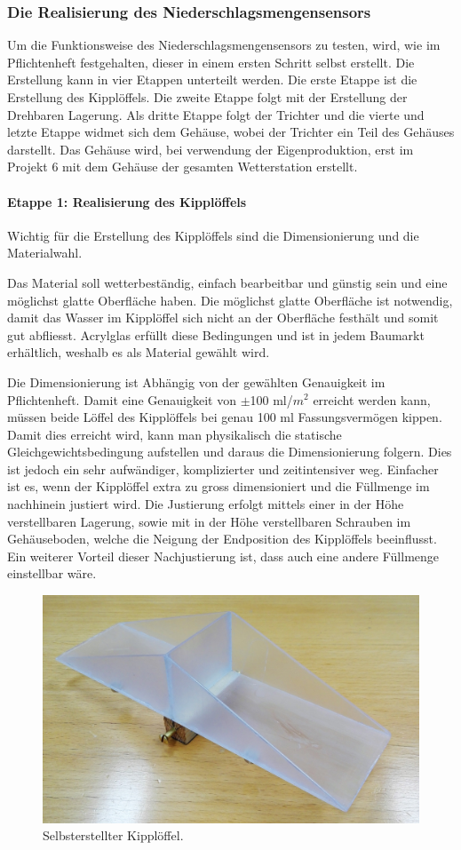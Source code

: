 \subsubsection*{Die Realisierung des Niederschlagsmengensensors}
Um die Funktionsweise des Niederschlagsmengensensors  zu testen, wird, wie im Pflichtenheft festgehalten, dieser in einem ersten Schritt selbst erstellt. Die Erstellung kann in vier Etappen unterteilt werden. Die erste Etappe ist die Erstellung des Kipplöffels. Die zweite Etappe folgt mit der Erstellung der Drehbaren Lagerung. Als dritte Etappe folgt der Trichter und die vierte und letzte Etappe widmet sich dem Gehäuse, wobei der Trichter ein Teil des Gehäuses darstellt. Das Gehäuse wird, bei verwendung der Eigenproduktion, erst im Projekt 6 mit dem Gehäuse der gesamten Wetterstation erstellt.
\paragraph{Etappe 1: Realisierung des Kipplöffels}
Wichtig für die Erstellung des Kipplöffels sind die Dimensionierung und die Materialwahl.
 
Das Material soll wetterbeständig, einfach bearbeitbar und günstig sein und eine möglichst glatte Oberfläche haben. Die möglichst glatte Oberfläche ist notwendig, damit das Wasser im Kipplöffel sich nicht an der Oberfläche festhält und somit gut abfliesst. Acrylglas erfüllt diese Bedingungen und ist in jedem Baumarkt erhältlich, weshalb es als Material gewählt wird.

Die Dimensionierung ist Abhängig von der gewählten Genauigkeit im Pflichtenheft. Damit eine Genauigkeit von $\pm$100 ml/$m^2$ erreicht werden kann, müssen beide Löffel des Kipplöffels bei genau 100 ml Fassungsvermögen kippen. Damit dies erreicht wird, kann man physikalisch die statische Gleichgewichtsbedingung aufstellen und daraus die Dimensionierung folgern. Dies ist jedoch ein sehr aufwändiger, komplizierter und zeitintensiver weg. Einfacher ist es, wenn der Kipplöffel extra zu gross dimensioniert und die Füllmenge im nachhinein justiert wird. Die Justierung erfolgt mittels einer in der Höhe verstellbaren Lagerung, sowie mit in der Höhe verstellbaren Schrauben im Gehäuseboden, welche die Neigung der Endposition des Kipplöffels beeinflusst. Ein weiterer Vorteil dieser Nachjustierung ist, dass auch eine andere Füllmenge einstellbar wäre.

\begin{figure}[h]
\centering
\includegraphics[width=0.8\linewidth]{graphics/Etappe1.jpg}
\caption{Selbsterstellter Kipplöffel.}
\label{fig:Etappe1}
\end{figure}

